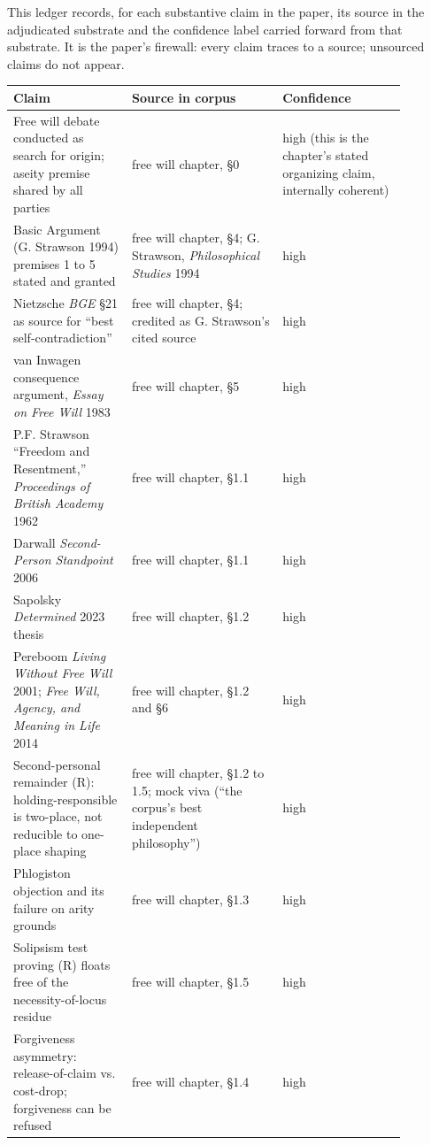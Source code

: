 \documentclass[11pt]{article}
\begin{document}
This ledger records, for each substantive claim in the paper, its source in the adjudicated substrate and the confidence label carried forward from that substrate. It is the paper's firewall: every claim traces to a source; unsourced claims do not appear.

{\small\begin{longtable}{>{\raggedright\arraybackslash}p{0.269\linewidth}>{\raggedright\arraybackslash}p{0.333\linewidth}>{\raggedright\arraybackslash}p{0.278\linewidth}}
\toprule
\textbf{Claim} & \textbf{Source in corpus} & \textbf{Confidence} \\ \midrule\endhead
Free will debate conducted as search for origin; aseity premise shared by all parties & free will chapter, §0 & high (this is the chapter's stated organizing claim, internally coherent) \\
Basic Argument (G. Strawson 1994) premises 1 to 5 stated and granted & free will chapter, §4; G. Strawson, \emph{Philosophical Studies} 1994 & high \\
Nietzsche \emph{BGE} §21 as source for ``best self-contradiction'' & free will chapter, §4; credited as G. Strawson's cited source & high \\
van Inwagen consequence argument, \emph{Essay on Free Will} 1983 & free will chapter, §5 & high \\
P.F. Strawson ``Freedom and Resentment,'' \emph{Proceedings of British Academy} 1962 & free will chapter, §1.1 & high \\
Darwall \emph{Second-Person Standpoint} 2006 & free will chapter, §1.1 & high \\
Sapolsky \emph{Determined} 2023 thesis & free will chapter, §1.2 & high \\
Pereboom \emph{Living Without Free Will} 2001; \emph{Free Will, Agency, and Meaning in Life} 2014 & free will chapter, §1.2 and §6 & high \\
Second-personal remainder (R): holding-responsible is two-place, not reducible to one-place shaping & free will chapter, §1.2 to 1.5; mock viva (``the corpus's best independent philosophy'') & high \\
Phlogiston objection and its failure on arity grounds & free will chapter, §1.3 & high \\
Solipsism test proving (R) floats free of the necessity-of-locus residue & free will chapter, §1.5 & high \\
Forgiveness asymmetry: release-of-claim vs. cost-drop; forgiveness can be refused & free will chapter, §1.4 & high \\

\end{longtable}}
\end{document}

